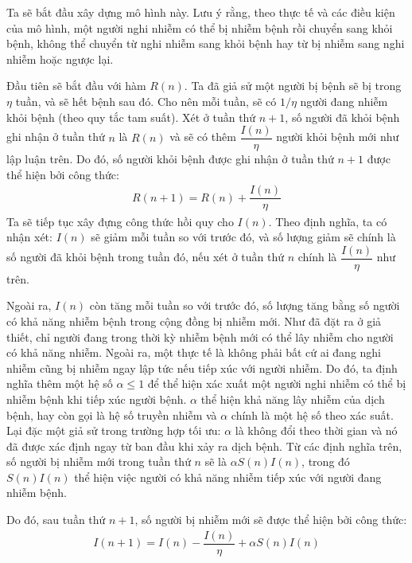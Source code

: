 \documentclass[a4paper]{article}
\begin{document}
Ta sẽ bắt đầu xây dựng mô hình này. Lưu ý rằng, theo thực tế và các điều kiện của mô hình, một người nghi nhiễm có thể bị nhiễm bệnh rồi chuyển sang khỏi bệnh, không thể chuyển từ nghi nhiễm sang khỏi bệnh hay từ bị nhiễm sang nghi nhiễm hoặc ngược lại.

Đầu tiên sẽ bắt đầu với hàm $R(n)$. Ta đã giả sử một người bị bệnh sẽ bị trong $\eta$ tuần, và sẽ hết bệnh sau đó. Cho nên mỗi tuần, sẽ có $1/\eta $ người đang nhiễm khỏi bệnh (theo quy tắc tam suất). Xét ở tuần thứ $n+1$, số người đã khỏi bệnh ghi nhận ở tuần thứ $n$ là $R(n)$ và sẽ có thêm $\dfrac{I(n)}{\eta}$ người khỏi bệnh mới như lập luận trên. Do đó, số người khỏi 
bệnh được ghi nhận ở tuần thứ $n+1$ được thể hiện bởi công thức:
\begin{align*}
     R(n+1)=R(n)+\dfrac{I(n)}{\eta}
\end{align*}
Ta sẽ tiếp tục xây đựng công thức hồi quy cho $I(n)$. Theo định nghĩa, ta có nhận xét: $I(n)$ sẽ giảm mỗi tuần so với trước đó, và số lượng giảm sẽ chính là số người đã khỏi bệnh trong tuần đó, nếu xét ở tuần thứ $n$ chính là  $\dfrac{I(n)}{\eta}$ như trên.

Ngoài ra, $I(n)$ còn tăng mỗi tuần so với trước đó, số lượng tăng bằng số người có khả năng nhiễm bệnh trong cộng đồng bị nhiễm mới. Như đã đặt ra ở giả thiết, chỉ người đang trong thời kỳ nhiễm bệnh mới có thể lây nhiễm cho người có khả năng nhiễm. Ngoài ra, một thực tế là không phải bất cứ ai đang nghi nhiễm cũng bị nhiễm ngay lập tức nếu tiếp xúc với người nhiễm. Do đó, ta định nghĩa thêm một hệ số $\alpha \leq 1$ để thể 
hiện xác xuất một người nghi nhiễm có thể bị nhiễm bệnh khi tiếp xúc người bệnh. $\alpha $ thể hiện khả năng lây nhiễm của dịch bệnh, hay còn gọi là hệ số truyền nhiễm và $\alpha$ chính là một hệ số theo xác suất. Lại đặc một giả sử trong trường hợp tối ưu: $\alpha$ là không đổi theo thời gian và nó đã được xác định ngay từ ban đầu khi xảy ra dịch bệnh. Từ các định nghĩa trên, số người bị nhiễm mới trong tuần thứ $n$ sẽ là $\alpha S(n)I(n)$, trong đó $S(n)I(n)$ thể hiện việc người có khả năng nhiễm tiếp xúc với người đang nhiễm bệnh.

Do đó, sau tuần thứ $n+1$, số người bị nhiễm mới sẽ được thể hiện bởi công thức:
\begin{align*}
    I(n+1)=I(n)-\dfrac{I(n)}{\eta}+\alpha S(n)I(n)
\end{align*}
\end{document}
